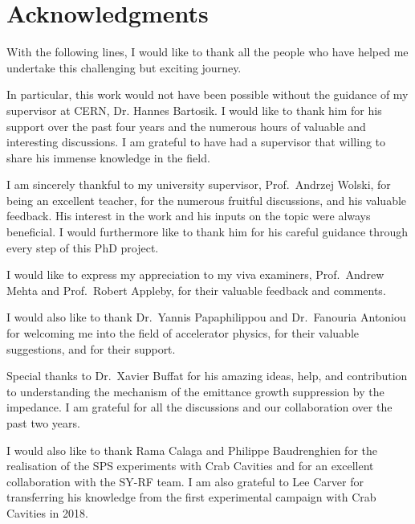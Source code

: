 \cleardoublepage
\chapter*{Acknowledgments}
\thispagestyle{simple} %



With the following lines, I would like to thank all the people who have helped me undertake this challenging but exciting journey.

In particular, this work would not have been possible without the guidance of my supervisor at CERN, Dr. Hannes Bartosik. I would like to thank him for his support over the past four years and the numerous hours of valuable and interesting discussions. I am grateful to have had a supervisor that willing to share his immense knowledge in the field.

I am sincerely thankful to my university supervisor, Prof.~Andrzej Wolski, for being an excellent teacher, for the numerous fruitful discussions, and his valuable feedback. His interest in the work and his inputs on the topic were always beneficial. I would furthermore like to thank him for his careful guidance through every step of this PhD project. 

I would like to express my appreciation to my viva examiners, Prof.~Andrew Mehta and Prof.~Robert Appleby, for their valuable feedback and comments.

I would also like to thank Dr.~Yannis Papaphilippou and Dr.~Fanouria Antoniou for welcoming me into the field of accelerator physics, for their valuable suggestions, and for their support.

Special thanks to Dr.~Xavier Buffat for his amazing ideas, help, and contribution to understanding the mechanism of the emittance growth suppression by the impedance. I am grateful for all the discussions and our collaboration over the past two years. 

I would also like to thank Rama Calaga and Philippe Baudrenghien for the realisation of the SPS experiments with Crab Cavities and for an excellent collaboration with the SY-RF team. I am also grateful to Lee Carver for transferring his knowledge from the first experimental campaign with Crab Cavities in 2018.

